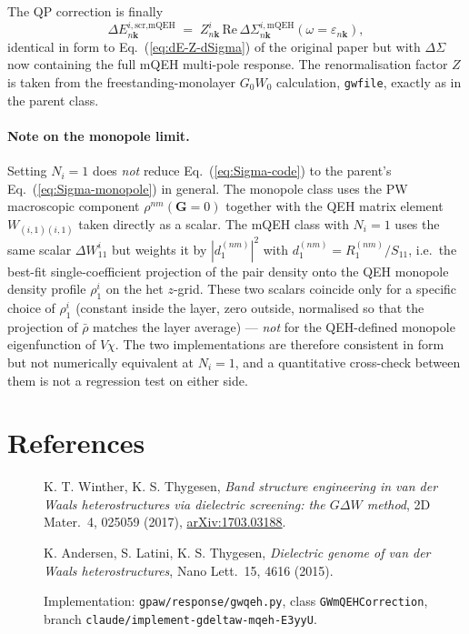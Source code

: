 \documentclass[11pt,a4paper]{article}
\newcommand{\GG}{\mathbf{G}}
\newcommand{\kk}{\mathbf{k}}
\newcommand{\eps}{\varepsilon}
\newcommand{\eq}[1]{Eq.~(\ref{eq:#1})}
\begin{document}
The QP correction is finally
\begin{equation}
\Delta E^{i,\text{scr,mQEH}}_{n\kk}
\;=\;Z_{n\kk}^{i}\,
\mathrm{Re}\,\Delta\Sigma^{i,\text{mQEH}}_{n\kk}(\omega=\eps_{n\kk}),
\end{equation}
identical in form to \eq{dE-Z-dSigma} of the original paper but with
$\Delta\Sigma$ now containing the full mQEH multi-pole response.  The
renormalisation factor $Z$ is taken from the freestanding-monolayer
$G_0W_0$ calculation, \texttt{gwfile}, exactly as in the parent class.

\paragraph{Note on the monopole limit.}
Setting $N_i=1$ does \emph{not} reduce \eq{Sigma-code} to the
parent's \eq{Sigma-monopole} in general.  The monopole class uses the
PW macroscopic component $\rho^{nm}(\GG=0)$ together with the QEH
matrix element $W_{(i,1)(i,1)}$ taken directly as a scalar.  The
mQEH class with $N_i=1$ uses the same scalar $\Delta W^{i}_{11}$ but
weights it by $|d^{(nm)}_{1}|^{2}$ with $d^{(nm)}_{1} = R^{(nm)}_{1}/S_{11}$,
i.e.\ the best-fit single-coefficient projection of the pair density
onto the QEH monopole density profile $\rho^{i}_{1}$ on the het
$z$-grid.  These two scalars coincide only for a specific choice of
$\rho^{i}_{1}$ (constant inside the layer, zero outside, normalised
so that the projection of $\bar\rho$ matches the layer average) ---
\emph{not} for the QEH-defined monopole eigenfunction of $V\chi$.
The two implementations are therefore consistent in form but not
numerically equivalent at $N_i=1$, and a quantitative cross-check
between them is not a regression test on either side.

\section*{References}

\begin{description}
\item[\textbullet] K. T. Winther, K. S. Thygesen,
  \emph{Band structure engineering in van der Waals heterostructures
  via dielectric screening: the $G\Delta W$ method}, 2D Mater.\ 4,
  025059 (2017), \href{https://arxiv.org/abs/1703.03188}{arXiv:1703.03188}.
\item[\textbullet] K. Andersen, S. Latini, K. S. Thygesen,
  \emph{Dielectric genome of van der Waals heterostructures},
  Nano Lett.\ 15, 4616 (2015).
\item[\textbullet] Implementation:
  \texttt{gpaw/response/gwqeh.py}, class
  \texttt{GWmQEHCorrection},
  branch \texttt{claude/implement-gdeltaw-mqeh-E3yyU}.
\end{description}
\end{document}
